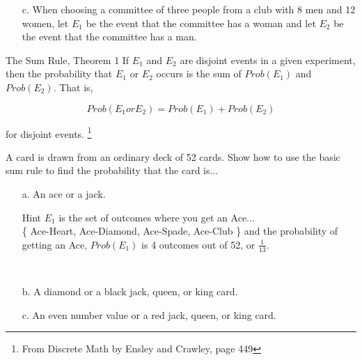 {\begin{questionNOGRADE}{\thequestion}
\begin{itemize}
                \item[c.] When choosing a committee of three people from a
                club with 8 men and 12 women, let $E_1$ be the event that the committee
                has a woman and let $E_2$ be the event that the committee has a man. ~\\
            \end{itemize}        
    \end{questionNOGRADE}

    \newpage

        \begin{intro}{The Sum Rule, Theorem 1}
            If $E_1$ and $E_2$ are disjoint events in a given experiment,
            then the probability that $E_1$ or $E_2$ occurs is the sum of
            $Prob(E_1)$ and $Prob(E_2)$. That is,

            $$Prob(E_1 or E_2) = Prob(E_1) + Prob(E_2)$$

            for disjoint events.
            \footnote{From Discrete Math by Ensley and Crawley, page 449}
        \end{intro}

    \begin{questionNOGRADE}{\thequestion}
        A card is drawn from an ordinary deck of 52 cards. Show how
        to use the basic sum rule to find the probability that
        the card is...
        
        \begin{itemize}
            \item[a.] An ace or a jack.
                    \begin{hint}{Hint}
                        $E_{1}$ is the set of outcomes where you get an Ace... \\
                        \{ Ace-Heart, Ace-Diamond, Ace-Spade, Ace-Club \}
                        and the probability of getting an Ace, $Prob(E_{1})$
                        is 4 outcomes out of 52, or $\frac{1}{13}$.
                    \end{hint}
                    ~\\ \vspace{1cm}

            \item[b.] A diamond or a black jack, queen, or king card.
                    ~\\ \vspace{2cm}

            \item[c.] An even number value or a red jack, queen, or king card.
                    ~\\ \vspace{1cm}
        \end{itemize}
    \end{questionNOGRADE}

}
